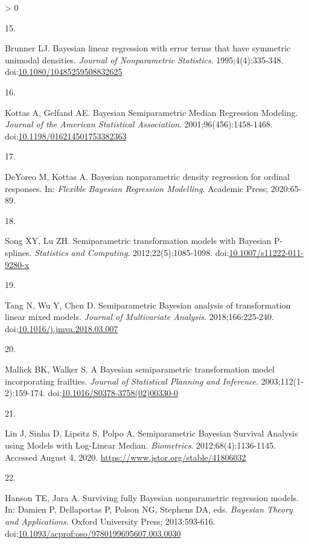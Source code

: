 \documentclass[
]{article}
\newlength{\cslhangindent}
\newlength{\csllabelwidth}
\newenvironment{CSLReferences}[2] %
 {%
  \setlength{\parindent}{0pt}
  \ifodd #1 \everypar{\setlength{\hangindent}{\cslhangindent}}\ignorespaces\fi
  \ifnum #2 > 0
  \setlength{\parskip}{#2\baselineskip}
  \fi
 }%
 {}
\newcommand{\CSLLeftMargin}[1]{\parbox[t]{\csllabelwidth}{#1}}
\newcommand{\CSLRightInline}[1]{\parbox[t]{\linewidth - \csllabelwidth}{#1}\break}
\begin{document}
\begin{CSLReferences}{0}{0}
\leavevmode\hypertarget{ref-brunner_bayesian_1995}{}%
\CSLLeftMargin{15. }
\CSLRightInline{Brunner LJ. Bayesian linear regression with error terms that have symmetric unimodal densities. \emph{Journal of Nonparametric Statistics}. 1995;4(4):335-348. doi:\href{https://doi.org/10.1080/10485259508832625}{10.1080/10485259508832625}}

\leavevmode\hypertarget{ref-kottas_bayesian_2001}{}%
\CSLLeftMargin{16. }
\CSLRightInline{Kottas A, Gelfand AE. Bayesian {Semiparametric} {Median} {Regression} {Modeling}. \emph{Journal of the American Statistical Association}. 2001;96(456):1458-1468. doi:\href{https://doi.org/10.1198/016214501753382363}{10.1198/016214501753382363}}

\leavevmode\hypertarget{ref-deyoreo_bayesian_2020}{}%
\CSLLeftMargin{17. }
\CSLRightInline{DeYoreo M, Kottas A. Bayesian nonparametric density regression for ordinal responses. In: \emph{Flexible {Bayesian} Regression Modelling}. Academic Press; 2020:65-89.}

\leavevmode\hypertarget{ref-song_semiparametric_2012}{}%
\CSLLeftMargin{18. }
\CSLRightInline{Song XY, Lu ZH. Semiparametric transformation models with {Bayesian} {P}-splines. \emph{Statistics and Computing}. 2012;22(5):1085-1098. doi:\href{https://doi.org/10.1007/s11222-011-9280-x}{10.1007/s11222-011-9280-x}}

\leavevmode\hypertarget{ref-tang_semiparametric_2018}{}%
\CSLLeftMargin{19. }
\CSLRightInline{Tang N, Wu Y, Chen D. Semiparametric {Bayesian} analysis of transformation linear mixed models. \emph{Journal of Multivariate Analysis}. 2018;166:225-240. doi:\href{https://doi.org/10.1016/j.jmva.2018.03.007}{10.1016/j.jmva.2018.03.007}}

\leavevmode\hypertarget{ref-mallick_bayesian_2003}{}%
\CSLLeftMargin{20. }
\CSLRightInline{Mallick BK, Walker S. A {Bayesian} semiparametric transformation model incorporating frailties. \emph{Journal of Statistical Planning and Inference}. 2003;112(1-2):159-174. doi:\href{https://doi.org/10.1016/S0378-3758(02)00330-0}{10.1016/S0378-3758(02)00330-0}}

\leavevmode\hypertarget{ref-lin_semiparametric_2012}{}%
\CSLLeftMargin{21. }
\CSLRightInline{Lin J, Sinha D, Lipsitz S, Polpo A. Semiparametric {Bayesian} {Survival} {Analysis} using {Models} with {Log}-{Linear} {Median}. \emph{Biometrics}. 2012;68(4):1136-1145. Accessed August 4, 2020. \url{https://www.jstor.org/stable/41806032}}

\leavevmode\hypertarget{ref-damien_surviving_2013}{}%
\CSLLeftMargin{22. }
\CSLRightInline{Hanson TE, Jara A. Surviving fully {Bayesian} nonparametric regression models. In: Damien P, Dellaportas P, Polson NG, Stephens DA, eds. \emph{Bayesian {Theory} and {Applications}}. Oxford University Press; 2013:593-616. doi:\href{https://doi.org/10.1093/acprof:oso/9780199695607.003.0030}{10.1093/acprof:oso/9780199695607.003.0030}}


\end{CSLReferences}
\end{document}
